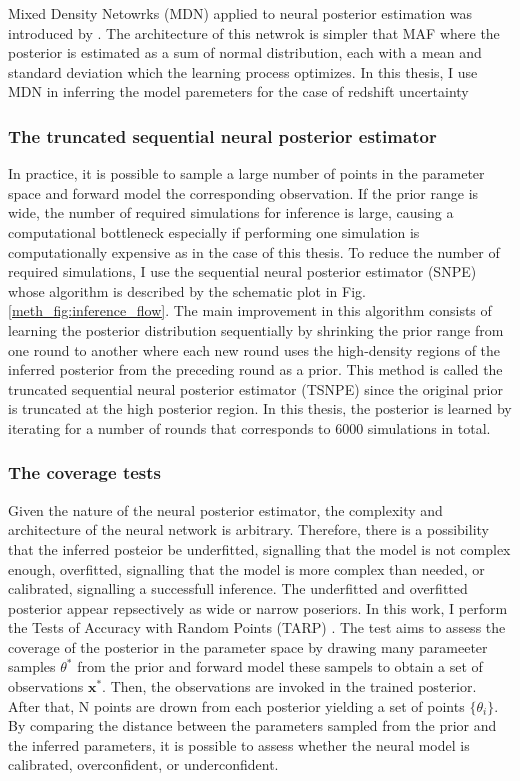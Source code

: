 Mixed Density Netowrks (MDN) applied to neural posterior estimation was introduced by \citet{papamakarios2016fast}. The architecture of this netwrok is simpler that MAF where the posterior is estimated as a sum of normal distribution, each with a mean and standard deviation which the learning process optimizes. In this thesis, I use MDN in inferring the model paremeters for the case of redshift uncertainty


\subsubsection{The truncated sequential neural posterior estimator}
In practice, it is possible to sample a large number of points in the parameter space and forward model the corresponding observation. If the prior range is wide, the number of required simulations for inference is large, causing a computational bottleneck especially if performing one simulation is computationally expensive as in the case of this thesis. To reduce the number of required simulations, I use the sequential neural posterior estimator (SNPE) whose algorithm is described by the schematic plot in Fig. \ref{meth_fig:inference_flow}. The main improvement in this algorithm consists of learning the posterior distribution sequentially by shrinking the prior range from one round to another where each new round uses the high-density regions of the inferred posterior from the preceding round as a prior. This method is called the truncated sequential neural posterior estimator (TSNPE) \citep{deistler2022truncated} since the original prior is truncated at the high posterior region. In this thesis, the posterior is learned by iterating for a number of rounds that corresponds to 6000 simulations in total.

\subsubsection{The coverage tests}
Given the nature of the neural posterior estimator, the complexity and architecture of the neural network is arbitrary. Therefore, there is a possibility that the inferred posteior be underfitted, signalling that the model is not complex enough, overfitted, signalling that the model is more complex than needed, or calibrated, signalling a successfull inference. The underfitted and overfitted posterior appear repsectively as wide or narrow poseriors. In this work, I perform the Tests
of Accuracy with Random Points (TARP) \citep{lemos2023sampling}. The test aims to assess the coverage of the posterior in the parameter space by drawing many parameeter samples $\theta^{\ast}$ from the prior and forward model these sampels to obtain a set of observations $\mathbf{x}^\ast$. Then, the observations are invoked in the trained posterior. After that, N points are drown from each posterior yielding a set of points $\{\theta_i\}$. By comparing the distance between the parameters sampled from the prior and the inferred parameters, it is possible to assess whether the neural model is calibrated, overconfident, or underconfident. 

